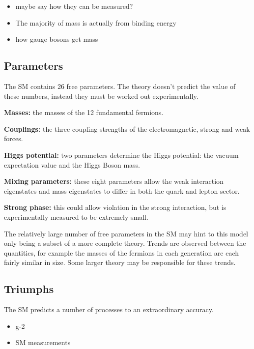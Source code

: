 {\color{Red}
\begin{itemize}
\item maybe say how they can be measured?
\item The majority of mass is actually from binding energy 
\item how gauge bosons get mass
\end{itemize}}


\subsection{Parameters}

The SM contains 26 free parameters. The theory doesn't predict the value of these numbers, instead they must be worked out experimentally.  
\begin{description}
\item \textbf{Masses:} the masses of the 12 fundamental fermions.
\item \textbf{Couplings:} the three coupling strengths of the electromagnetic, strong and weak forces.
\item \textbf{Higgs potential:} two parameters determine the Higgs potential: the vacuum expectation value and the Higgs Boson mass.
\item \textbf{Mixing parameters:} these eight parameters allow the weak interaction eigenstates and mass eigenstates to differ in both the quark and lepton sector.
\item \textbf{Strong \CP  phase:} this could allow \CP violation in the strong interaction, but is experimentally measured to be extremely small.
\end{description}

The relatively large number of free parameters in the SM may hint to this model only being a subset of a more complete theory. Trends are observed between the quantities, for example the masses of the fermions in each generation are each fairly similar in size. Some larger theory may be responsible for these trends.  

\subsection{Triumphs}
The SM predicts a number of processes to an extraordinary accuracy. 

\begin{itemize}
\item g-2
\item SM measurements
\end{itemize}

